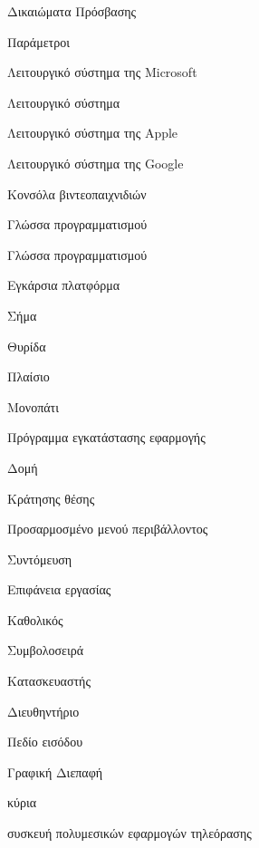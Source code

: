 
\gl
{}
{Δικαιώματα Πρόσβασης}



\gl
{}
{Παράμετροι}


\gl
{}
{Λειτουργικό σύστημα της Microsoft}



\gl
{}
{Λειτουργικό σύστημα}


\gl
{}
{Λειτουργικό σύστημα της Apple}


\gl
{}
{Λειτουργικό σύστημα της Google}


\gl
{}
{Κονσόλα βιντεοπαιχνιδιών}

\gl
{}
{Γλώσσα προγραμματισμού}

\gl
{}
{Γλώσσα προγραμματισμού}

\gl
{}
{Εγκάρσια πλατφόρμα}



\gl
{}
{Σήμα}


\gl
{}
{Θυρίδα}



\gl
{}
{Πλαίσιο}



\gl
{}
{Μονοπάτι}


\gl
{}
{Πρόγραμμα εγκατάστασης εφαρμογής}

\gl
{}
{}



\gl
{}
{Δομή}


\gl
{}
{Κράτησης θέσης}



\gl
{}
{Προσαρμοσμένο μενού περιβάλλοντος}


\gl
{}
{Συντόμευση}


\gl
{}
{Επιφάνεια εργασίας}



\gl
{}
{Καθολικός}


\gl
{}
{Συμβολοσειρά}



\gl
{}
{Kατασκευαστής}


\gl
{}
{Διευθηντήριο}


\gl
{}
{Πεδίο εισόδου}

\gl
{}
{Γραφική Διεπαφή}




\gl
{}
{κύρια}



\gl
{}
{συσκευή πολυμεσικών εφαρμογών τηλεόρασης}